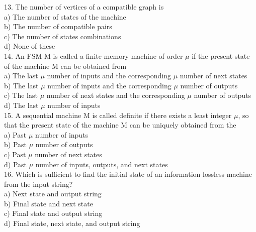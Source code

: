 \documentclass{article}
\begin{document}
\begin{multicols}{2}
\vspace*{0.3cm}
13. The number of vertices of a compatible
graph is\\
\hspace*{0.4cm} a) The number of states of the machine\\
\hspace*{0.4cm} b) The number of compatible pairs\\
\hspace*{0.4cm} c) The number of states combinations\\
\hspace*{0.4cm} d) None of these\\

\vspace*{0.3cm}
14. An FSM M is called a finite memory
machine of order $\mu$ if the present state of the
machine M can be obtained from\\
\hspace*{0.4cm} a) The last $\mu$ number of inputs and the
corresponding $\mu$ number of next states\\
\hspace*{0.4cm} b) The last $\mu$ number of inputs and the
corresponding $\mu$ number of outputs\\
\hspace*{0.4cm} c) The last $\mu$ number of next states and the
corresponding $\mu$ number of outputs\\
\hspace*{0.4cm} d) The last $\mu$ number of inputs\\

\vspace*{0.3cm}
15. A sequential machine M is called definite if
there exists a least integer $\mu$, so that the present
state of the machine M can be uniquely
obtained from the\\
\hspace*{0.4cm} a) Past $\mu$ number of inputs\\
\hspace*{0.4cm} b) Past $\mu$ number of outputs\\
\hspace*{0.4cm} c) Past $\mu$ number of next states\\
\hspace*{0.4cm} d) Past $\mu$ number of inputs, outputs, and
next states\\

\vspace*{0.3cm}
16. Which is sufficient to find the initial state
of an information lossless machine from the
input string?\\
\hspace*{0.4cm} a) Next state and output string\\
\hspace*{0.4cm} b) Final state and next state\\
\hspace*{0.4cm} c) Final state and output string\\
\hspace*{0.4cm} d) Final state, next state, and output string\\


\end{multicols}
\end{document}
